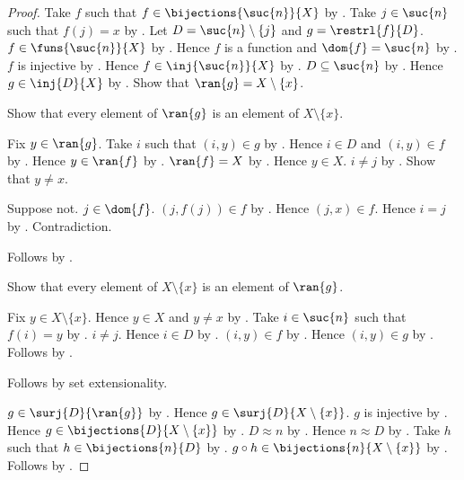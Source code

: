 \begin{proof}
    Take $f$ such that $f\in\bijections{\suc{n}}{X}$ by
        .
    Take $j\in\suc{n}$ such that $f(j)=x$ by
        .
    Let $D=\suc{n}\setminus\{j\}$ and $g=\restrl{f}{D}$.
    $f\in\funs{\suc{n}}{X}$ by .
    Hence $f$ is a function and $\dom{f}=\suc{n}$ by
        .
    $f$ is injective by .
    Hence $f\in\inj{\suc{n}}{X}$ by
        .
    $D\subseteq\suc{n}$ by .
    Hence $g\in\inj{D}{X}$ by .
    Show that $\ran{g}=X\setminus\{x\}$.
    \begin{subproof}
        Show that every element of $\ran{g}$ is an element of
            $X\setminus\{x\}$.
        \begin{subproof}
            Fix $y\in\ran{g}$.
            Take $i$ such that $(i,y)\in g$ by .
            Hence $i\in D$ and $(i,y)\in f$ by .
            Hence $y\in\ran{f}$ by .
            $\ran{f}=X$ by .
            Hence $y\in X$.
            $i\neq j$ by .
            Show that $y\neq x$.
            \begin{subproof}
                Suppose not.
                $j\in\dom{f}$.
                $(j,f(j))\in f$ by .
                Hence $(j,x)\in f$.
                Hence $i=j$ by .
                Contradiction.
            \end{subproof}
            Follows by .
        \end{subproof}
        Show that every element of $X\setminus\{x\}$ is an element of
            $\ran{g}$.
        \begin{subproof}
            Fix $y\in X\setminus\{x\}$.
            Hence $y\in X$ and $y\neq x$ by
                .
            Take $i\in\suc{n}$ such that $f(i)=y$ by
                .
            $i\neq j$.
            Hence $i\in D$ by .
            $(i,y)\in f$ by .
            Hence $(i,y)\in g$ by .
            Follows by .
        \end{subproof}
        Follows by set extensionality.
    \end{subproof}
    $g\in\surj{D}{\ran{g}}$ by .
    Hence $g\in\surj{D}{X\setminus\{x\}}$.
    $g$ is injective by .
    Hence $g\in\bijections{D}{X\setminus\{x\}}$ by
        .
    $D\approx n$ by .
    Hence $n\approx D$ by .
    Take $h$ such that $h\in\bijections{n}{D}$ by .
    $g\circ h\in\bijections{n}{X\setminus\{x\}}$ by
        .
    Follows by .
\end{proof}

